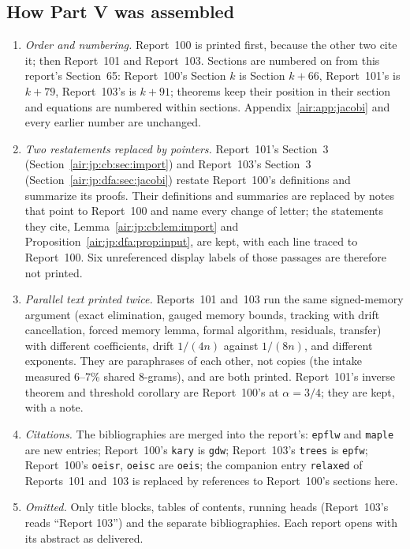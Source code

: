 \documentclass[11pt,letterpaper]{article}
\numberwithin{equation}{section}
\theoremstyle{remark}
\begin{document}
\subsection{How Part V was assembled}\label{air:jp:sec:assembly}
\begin{enumerate}
\item \emph{Order and numbering.} Report~100 is printed first, because the other two cite it; then Report~101 and Report~103. Sections are numbered on from this report's Section~65: Report~100's Section $k$ is Section $k+66$, Report~101's is $k+79$, Report~103's is $k+91$; theorems keep their position in their section and equations are numbered within sections. Appendix~\ref{air:app:jacobi} and every earlier number are unchanged.
\item \emph{Two restatements replaced by pointers.} Report~101's Section~3 (Section~\ref{air:jp:cb:sec:import}) and Report~103's Section~3 (Section~\ref{air:jp:dfa:sec:jacobi}) restate Report~100's definitions and summarize its proofs. Their definitions and summaries are replaced by notes that point to Report~100 and name every change of letter; the statements they cite, Lemma~\ref{air:jp:cb:lem:import} and Proposition~\ref{air:jp:dfa:prop:input}, are kept, with each line traced to Report~100. Six unreferenced display labels of those passages are therefore not printed.
\item \emph{Parallel text printed twice.} Reports~101 and~103 run the same signed-memory argument (exact elimination, gauged memory bounds, tracking with drift cancellation, forced memory lemma, formal algorithm, residuals, transfer) with different coefficients, drift $1/(4n)$ against $1/(8n)$, and different exponents. They are paraphrases of each other, not copies (the intake measured 6--7\% shared 8-grams), and are both printed. Report~101's inverse theorem and threshold corollary are Report~100's at $\alpha=3/4$; they are kept, with a note.
\item \emph{Citations.} The bibliographies are merged into the report's: \texttt{epflw} and \texttt{maple} are new entries; Report~100's \texttt{kary} is \texttt{gdw}; Report~103's \texttt{trees} is \texttt{epfw}; Report~100's \texttt{oeisr}, \texttt{oeisc} are \texttt{oeis}; the companion entry \texttt{relaxed} of Reports~101 and~103 is replaced by references to Report~100's sections here.
\item \emph{Omitted.} Only title blocks, tables of contents, running heads (Report~103's reads ``Report 103'') and the separate bibliographies. Each report opens with its abstract as delivered.
\end{enumerate}
\end{document}
